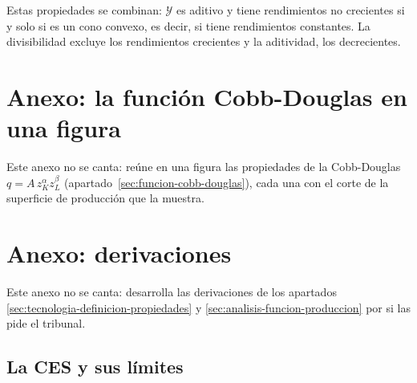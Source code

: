 \documentclass[11pt]{article}
\begin{document}
Estas propiedades se combinan: $\mathcal{Y}$ es aditivo y tiene rendimientos no crecientes si y solo si es un cono convexo, es decir, si tiene rendimientos constantes\nocite{MasColellWhinstonGreen1995}. La divisibilidad excluye los rendimientos crecientes y la aditividad, los decrecientes.

\section{Anexo: la función Cobb-Douglas en una figura}\label{anexo:cobb-douglas}

Este anexo no se canta: reúne en una figura las propiedades de la Cobb-Douglas $q=A\,z_K^{\alpha}z_L^{\beta}$ (apartado~\ref{sec:funcion-cobb-douglas}), cada una con el corte de la superficie de producción que la muestra.

\begin{infografia}[H]
\centering
\caption{La función Cobb-Douglas y sus propiedades: superficie, corte a capital fijo, isocuantas, corte a lo largo de un rayo, elasticidad de sustitución y participaciones de los factores}\label{figu:cobb-douglas}
\end{infografia}

\section{Anexo: derivaciones}\label{anexo:derivaciones}

Este anexo no se canta: desarrolla las derivaciones de los apartados \ref{sec:tecnologia-definicion-propiedades} y \ref{sec:analisis-funcion-produccion} por si las pide el tribunal.

\subsection{La CES y sus límites}\label{der:ces}
\end{document}
